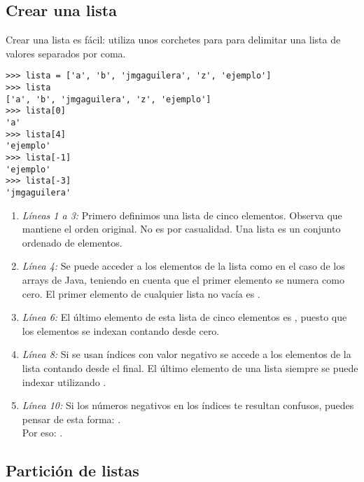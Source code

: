 \subsection{Crear una lista}

Crear una lista es fácil: utiliza unos corchetes para para delimitar una lista de valores separados por coma.

\noindent\begin{minipage}{\textwidth}
\begin{lstlisting}[mathescape=True]
>>> lista = ['a', 'b', 'jmgaguilera', 'z', 'ejemplo']
>>> lista
['a', 'b', 'jmgaguilera', 'z', 'ejemplo']
>>> lista[0]
'a'
>>> lista[4]
'ejemplo'
>>> lista[-1]
'ejemplo'
>>> lista[-3]
'jmgaguilera'
\end{lstlisting}
\end{minipage}

\begin{enumerate}

\item \emph{Líneas 1 a 3:} Primero definimos una lista de cinco elementos. Observa que mantiene el orden original. No es por casualidad. Una lista es un conjunto ordenado de elementos.

\item \emph{Línea 4:} Se puede acceder a los elementos de la lista como en el caso de los arrays de Java, teniendo en cuenta que el primer elemento se numera como cero. El primer elemento de cualquier lista no vacía es .

\item \emph{Línea 6:} El último elemento de esta lista de cinco elementos es , puesto que los elementos se indexan contando desde cero.

\item \emph{Línea 8:} Si se usan índices con valor negativo se accede a los elementos de la lista contando desde el final. El último elemento de una lista siempre se puede indexar utilizando .

\item \emph{Línea 10:} Si los números negativos en los índices te resultan confusos, puedes pensar de esta forma: .\\ Por eso: .

\end{enumerate}

\subsection{Partición de listas}

